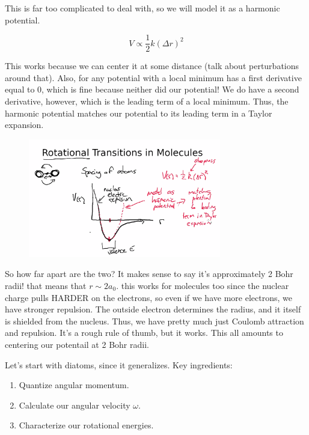 \documentclass{article}
\newcommand{\be}{\begin{equation}}
\newcommand{\ee}{\end{equation}}
\begin{document}
This is far too complicated to deal with, so we will model it as a harmonic potential. 

\be
V \propto \frac12 k \left(\Delta r\right)^2
\ee


This works because we can center it at some distance (talk about perturbations around that). Also, for any potential with a local minimum has a first derivative equal to 0, which is fine because neither did our potential! We do have a second derivative, however, which is the leading term of a local minimum. Thus, the harmonic potential matches our potential to its leading term in a Taylor expansion. 

\begin{figure}
    \centering
\includegraphics[width=0.75\textwidth]{figures/Screen Shot 2020-09-29 at 11.32.41 AM.png}
    \caption{}
    \label{fig:pot2}
\end{figure}

So how far apart are the two? It makes sense to say it's approximately 2 Bohr radii! that means that $r \sim 2 a_0$. this works for molecules too since the nuclear charge pulls HARDER on the electrons, so even if we have more electrons, we have stronger repulsion. The outside electron determines the radius, and it itself is shielded from the nucleus. Thus, we have pretty much just Coulomb attraction and repulsion. It's a rough rule of thumb, but it works. This all amounts to centering our potentail at 2 Bohr radii.

Let's start with diatoms, since it generalizes. Key ingredients:

\begin{enumerate}
    \item Quantize angular momentum.
    \item Calculate our angular velocity $\omega$. 
    \item Characterize our rotational energies. 
\end{enumerate}
\end{document}
